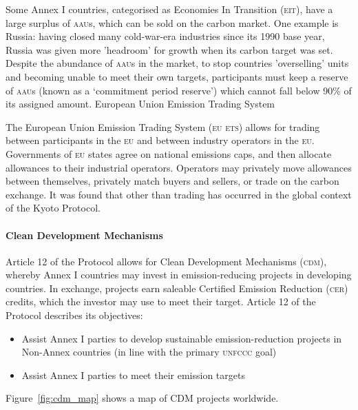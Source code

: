 Some Annex I countries, categorised as Economies In Transition (\textsc{eit}), have a large surplus of \textsc{aau}s, which can be sold on the carbon market. One example is Russia: having closed many cold-war-era industries since its 1990 base year, Russia was given more 'headroom' for growth when its carbon target was set. Despite the abundance of \textsc{aau}s in the market, to stop countries 'overselling' units and becoming unable to meet their own targets, participants must keep a reserve of \textsc{aau}s (known as a `commitment period reserve') which cannot fall below 90\% of its assigned amount.
European Union Emission Trading System

The European Union Emission Trading System (\textsc{eu ets}) allows for trading between participants in the \textsc{eu} and between industry operators in the \textsc{eu}. Governments of \textsc{eu} states agree on national emissions caps, and then allocate allowances to their industrial operators. Operators may privately move allowances between themselves, privately match buyers and sellers, or trade on the carbon exchange. It was found that other than trading has occurred in the global context of the Kyoto Protocol.~\cite{Grubb-09}

\paragraph{Clean Development Mechanisms}

Article 12 of the Protocol allows for Clean Development Mechanisms (\textsc{cdm}), whereby Annex I countries may invest in emission-reducing projects in developing countries. In exchange, projects earn saleable Certified Emission Reduction (\textsc{cer}) credits, which the investor may use to meet their target. Article 12 of the Protocol describes its objectives:

\begin{itemize}
	\item Assist Annex I parties to develop sustainable emission-reduction projects in Non-Annex countries (in line with the primary \textsc{unfccc} goal)
	\item Assist Annex I parties to meet their emission targets
\end{itemize}

Figure~\ref{fig:cdm_map} shows a map of CDM projects worldwide.

